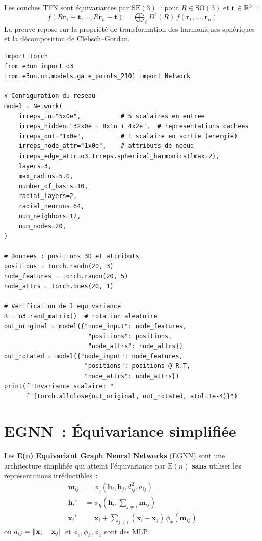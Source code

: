 \begin{theoreme}
Les couches TFN sont \'equivariantes par $\mathrm{SE}(3)$~: pour
$R \in \mathrm{SO}(3)$ et $\mathbf{t} \in \mathbb{R}^3$~:
\[
    f(R\mathbf{r}_1 + \mathbf{t}, \ldots, R\mathbf{r}_n + \mathbf{t})
    = \bigoplus_\ell D^\ell(R)\, f(\mathbf{r}_1, \ldots, \mathbf{r}_n)
\]
La preuve repose sur la propri\'et\'e de transformation des harmoniques
sph\'eriques et la d\'ecomposition de Clebsch--Gordan.
\end{theoreme}

\begin{codeblock}[title=\textbf{R\'eseau \'equivariant avec e3nn}]
\begin{verbatim}
import torch
from e3nn import o3
from e3nn.nn.models.gate_points_2101 import Network

# Configuration du reseau
model = Network(
    irreps_in="5x0e",           # 5 scalaires en entree
    irreps_hidden="32x0e + 8x1o + 4x2e",  # representations cachees
    irreps_out="1x0e",          # 1 scalaire en sortie (energie)
    irreps_node_attr="1x0e",    # attributs de noeud
    irreps_edge_attr=o3.Irreps.spherical_harmonics(lmax=2),
    layers=3,
    max_radius=5.0,
    number_of_basis=10,
    radial_layers=2,
    radial_neurons=64,
    num_neighbors=12,
    num_nodes=20,
)

# Donnees : positions 3D et attributs
positions = torch.randn(20, 3)
node_features = torch.randn(20, 5)
node_attrs = torch.ones(20, 1)

# Verification de l'equivariance
R = o3.rand_matrix()  # rotation aleatoire
out_original = model({"node_input": node_features,
                       "positions": positions,
                       "node_attrs": node_attrs})
out_rotated = model({"node_input": node_features,
                      "positions": positions @ R.T,
                      "node_attrs": node_attrs})
print(f"Invariance scalaire: "
      f"{torch.allclose(out_original, out_rotated, atol=1e-4)}")
\end{verbatim}
\end{codeblock}

\section{EGNN~: \'Equivariance simplifi\'ee}

\begin{definition}
Les \textbf{E(n) Equivariant Graph Neural Networks} (EGNN) sont une
architecture simplifi\'ee qui atteint l'\'equivariance par $\mathrm{E}(n)$
\textbf{sans} utiliser les repr\'esentations irr\'eductibles~:
\begin{align}
    \mathbf{m}_{ij} &= \phi_e(\mathbf{h}_i, \mathbf{h}_j, d_{ij}^2, a_{ij}) \\
    \mathbf{h}_i' &= \phi_h\!\left(\mathbf{h}_i, \sum_{j \neq i} \mathbf{m}_{ij}\right) \\
    \mathbf{x}_i' &= \mathbf{x}_i + \sum_{j \neq i} (\mathbf{x}_i - \mathbf{x}_j)\,
    \phi_x(\mathbf{m}_{ij})
\end{align}
o\`u $d_{ij} = \left\| \mathbf{x}_i - \mathbf{x}_j \right\|$ et $\phi_e, \phi_h, \phi_x$
sont des MLP.
\end{definition}

